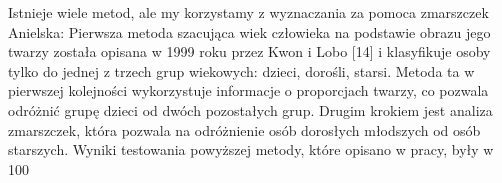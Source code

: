 Istnieje wiele metod, ale my korzystamy z wyznaczania za pomoca zmarszczek
Anielska:
Pierwsza metoda szacująca wiek człowieka na podstawie obrazu jego twarzy została opisana w 1999 roku przez Kwon i Lobo [14] i klasyfikuje osoby tylko do jednej z trzech grup wiekowych: dzieci, dorośli, starsi. Metoda ta w pierwszej kolejności wykorzystuje informacje o proporcjach twarzy, co pozwala odróżnić grupę dzieci od dwóch pozostałych grup. Drugim krokiem jest analiza zmarszczek, która pozwala na odróżnienie osób dorosłych młodszych od osób starszych. Wyniki testowania powyższej metody, które opisano w pracy, były w 100%